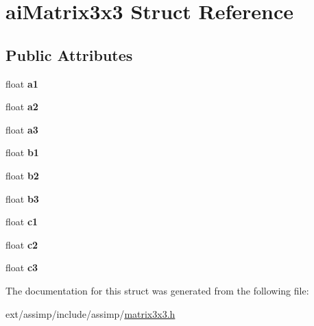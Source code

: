 \hypertarget{structai_matrix3x3}{\section{ai\-Matrix3x3 Struct Reference}
\label{structai_matrix3x3}
}
\subsection*{Public Attributes}
\begin{DoxyCompactItemize}
\item 
\hypertarget{structai_matrix3x3_a6884258a2f50758ed8b554b531186917}{float {\bfseries a1}}\label{structai_matrix3x3_a6884258a2f50758ed8b554b531186917}

\item 
\hypertarget{structai_matrix3x3_a4c74733870193040ba4953fb673e77df}{float {\bfseries a2}}\label{structai_matrix3x3_a4c74733870193040ba4953fb673e77df}

\item 
\hypertarget{structai_matrix3x3_a851d391df32a39e1ced1a9a286b38cf4}{float {\bfseries a3}}\label{structai_matrix3x3_a851d391df32a39e1ced1a9a286b38cf4}

\item 
\hypertarget{structai_matrix3x3_a9eeba340d3502017caad70416f03863a}{float {\bfseries b1}}\label{structai_matrix3x3_a9eeba340d3502017caad70416f03863a}

\item 
\hypertarget{structai_matrix3x3_a9f5e25b60bbd7bdf8f0a19cd82cc6b15}{float {\bfseries b2}}\label{structai_matrix3x3_a9f5e25b60bbd7bdf8f0a19cd82cc6b15}

\item 
\hypertarget{structai_matrix3x3_a21aa4345fe6ce2774db94d118c536d02}{float {\bfseries b3}}\label{structai_matrix3x3_a21aa4345fe6ce2774db94d118c536d02}

\item 
\hypertarget{structai_matrix3x3_ae62a2877076cbee151e89cb34567e3ca}{float {\bfseries c1}}\label{structai_matrix3x3_ae62a2877076cbee151e89cb34567e3ca}

\item 
\hypertarget{structai_matrix3x3_a8e0d85d5c46eb4f4478f1fe159be4320}{float {\bfseries c2}}\label{structai_matrix3x3_a8e0d85d5c46eb4f4478f1fe159be4320}

\item 
\hypertarget{structai_matrix3x3_aa7eef894dec22db1011092410b24f19b}{float {\bfseries c3}}\label{structai_matrix3x3_aa7eef894dec22db1011092410b24f19b}

\end{DoxyCompactItemize}


The documentation for this struct was generated from the following file\-:\begin{DoxyCompactItemize}
\item 
ext/assimp/include/assimp/\hyperlink{matrix3x3_8h}{matrix3x3.\-h}\end{DoxyCompactItemize}
